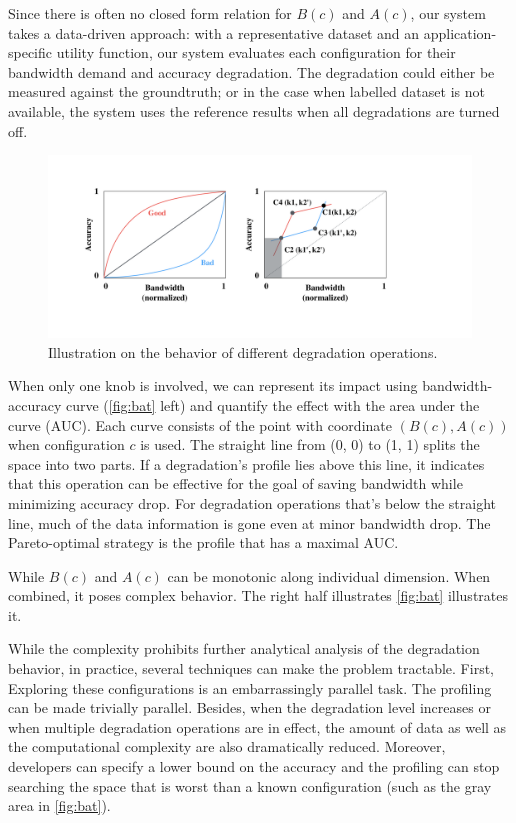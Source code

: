 Since there is often no closed form relation for $B(c)$ and $A(c)$, our system
takes a data-driven approach: with a representative dataset and an
application-specific utility function, our system evaluates each configuration
for their bandwidth demand and accuracy degradation. The degradation could
either be measured against the groundtruth; or in the case when labelled dataset
is not available, the system uses the reference results when all degradations
are turned off.

\begin{figure}
  \centering
  \includegraphics[width=\columnwidth]{figures/degrade.pdf}
  \caption{Illustration on the behavior of different degradation operations.}
  \label{fig:bat}
\end{figure}

When only one knob is involved, we can represent its impact using
bandwidth-accuracy curve (\autoref{fig:bat} left) and quantify the effect with
the area under the curve (AUC). Each curve consists of the point with coordinate
$(B(c), A(c))$ when configuration $c$ is used. The straight line from (0, 0) to
(1, 1) splits the space into two parts. If a degradation's profile lies above
this line, it indicates that this operation can be effective for the goal of
saving bandwidth while minimizing accuracy drop. For degradation operations
that's below the straight line, much of the data information is gone even at
minor bandwidth drop. The Pareto-optimal strategy is the profile that has a
maximal AUC.

While $B(c)$ and $A(c)$ can be monotonic along individual dimension. When
combined, it poses complex behavior. The right half illustrates
\autoref{fig:bat} illustrates it.

While the complexity prohibits further analytical analysis of the degradation
behavior, in practice, several techniques can make the problem tractable. First,
Exploring these configurations is an embarrassingly parallel task. The profiling
can be made trivially parallel. Besides, when the degradation level increases or
when multiple degradation operations are in effect, the amount of data as well
as the computational complexity are also dramatically reduced.  Moreover,
developers can specify a lower bound on the accuracy and the profiling can stop
searching the space that is worst than a known configuration (such as the gray
area in \autoref{fig:bat}).

